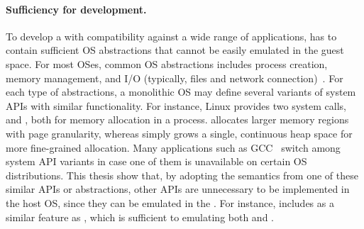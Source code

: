 \paragraph{Sufficiency for \libos{} development.}
To develop a \libos{} with compatibility against a wide range of applications,
\thehostabi{}
has to contain sufficient OS abstractions that cannot be easily emulated in the guest space.
For most OSes,
common OS abstractions
includes
process creation, memory management, and I/O (typically, files and network connection)~\cite{dhamdhere2007os-textbook}.
For each type of abstractions,
a monolithic OS may define several variants of system APIs with similar functionality.
For instance, Linux provides two system calls,  and , both for memory allocation in a process.
 allocates larger memory regions with page granularity,
whereas  simply grows a single, continuous heap space for more fine-grained allocation.
Many applications such as GCC~\cite{gcc}
switch among system API variants in case one of them is unavailable on certain OS distributions.
This thesis show that,
by adopting the semantics from one of these similar APIs or abstractions,
other APIs are unnecessary
to be implemented in the host OS, since they can be emulated in the \libos{}.
For instance, \thehostabi{} includes 
as a similar feature as ,
which is sufficient to emulating both  and .



